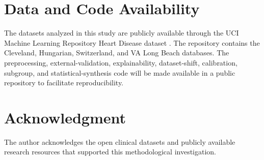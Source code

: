 \documentclass[10pt,journal,twocolumn]{IEEEtran}
\begin{document}

\section*{Data and Code Availability}

The datasets analyzed in this study are publicly available through the UCI Machine Learning Repository Heart Disease dataset \parencite{uciheart}. The repository contains the Cleveland, Hungarian, Switzerland, and VA Long Beach databases. The preprocessing, external-validation, explainability, dataset-shift, calibration, subgroup, and statistical-synthesis code will be made available in a public repository to facilitate reproducibility.


\section*{Acknowledgment}

The author acknowledges the open clinical datasets and publicly available research resources that supported this methodological investigation.


\begingroup
\setlength{\bibitemsep}{0pt}
\setlength{\bibparsep}{0pt}
\printbibliography
\endgroup
\end{document}
